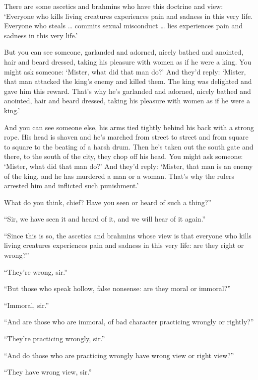 \documentclass[12pt,openany]{book}%
\begin{document}
There are some ascetics and brahmins who have this doctrine and view: ‘Everyone who kills living creatures experiences pain and sadness in this very life. Everyone who steals … commits sexual misconduct … lies experiences pain and sadness in this very life.’ 

But you can see someone, garlanded and adorned, nicely bathed and anointed, hair and beard dressed, taking his pleasure with women as if he were a king. You might ask someone: ‘Mister, what did that man do?’ And they’d reply: ‘Mister, that man attacked the king’s enemy and killed them. The king was delighted and gave him this reward. That’s why he’s garlanded and adorned, nicely bathed and anointed, hair and beard dressed, taking his pleasure with women as if he were a king.’ 

And you can see someone else, his arms tied tightly behind his back with a strong rope. His head is shaven and he’s marched from street to street and from square to square to the beating of a harsh drum. Then he’s taken out the south gate and there, to the south of the city, they chop off his head. You might ask someone: ‘Mister, what did that man do?’ And they’d reply: ‘Mister, that man is an enemy of the king, and he has murdered a man or a woman. That’s why the rulers arrested him and inflicted such punishment.’ 

What do you think, chief? Have you seen or heard of such a thing?” 

“Sir, we have seen it and heard of it, and we will hear of it again.” 

“Since this is so, the ascetics and brahmins whose view is that everyone who kills living creatures experiences pain and sadness in this very life: are they right or wrong?” 

“They’re wrong, sir.” 

“But those who speak hollow, false nonsense: are they moral or immoral?” 

“Immoral, sir.” 

“And are those who are immoral, of bad character practicing wrongly or rightly?” 

“They’re practicing wrongly, sir.” 

“And do those who are practicing wrongly have wrong view or right view?” 

“They have wrong view, sir.” 
\end{document}
